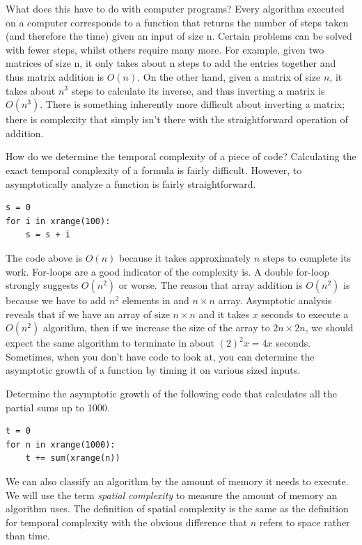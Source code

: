 What does this have to do with computer programs?  
Every algorithm executed on a computer corresponds to a function 
that returns the number of steps taken (and therefore the time) 
given an input of size n.  Certain problems can be solved with fewer steps,
whilst others require many more.  For example, given two matrices of size n,
it only takes about n steps to add the entries together and thus matrix addition is $O(n)$.  
On the other hand, given a matrix of size $n$, it takes about 
$n^3$ steps to calculate its inverse, 
and thus inverting a matrix is $O(n^3)$.
There is something inherently more difficult about inverting a matrix; 
there is complexity that simply isn't there with the straightforward operation of addition.

How do we determine the temporal complexity of a piece of code?
Calculating the exact temporal complexity of a formula is fairly difficult.
However, to asymptotically analyze a function is fairly straightforward.
\begin{lstlisting}
s = 0
for i in xrange(100):
    s = s + i
\end{lstlisting}
The code above is $O(n)$ because it takes approximately $n$ steps to complete its work.
For-loops are a good indicator of the complexity is.  A double for-loop strongly suggests
$O(n^2)$ or worse.  The reason that array addition is $O(n^2)$ is because we have to add
$n^2$ elements in and $n \times n$ array.  Asymptotic analysis reveals that
if we have an array of size $n \times n$ and it takes $x$ seconds to execute a $O(n^2)$ algorithm,
then if we increase the size of the array to $2n \times 2n$, we should expect the same algorithm
to terminate in about $(2)^2 x = 4x$ seconds.  Sometimes, when you don't have code to look at, 
you can determine the asymptotic growth of a function by timing it on various sized inputs.

\begin{problem}
Determine the asymptotic growth of the following code that calculates all the partial sums
up to 1000.
\begin{lstlisting}
t = 0
for n in xrange(1000):
    t += sum(xrange(n))
\end{lstlisting}
\end{problem}

We can also classify an algorithm by the amount of memory it needs to execute.  We will use the term \emph{spatial complexity} to measure the amount of memory an algorithm uses.  The definition of spatial complexity is the same as the definition for temporal complexity with the obvious difference that $n$ refers to space rather than time.

